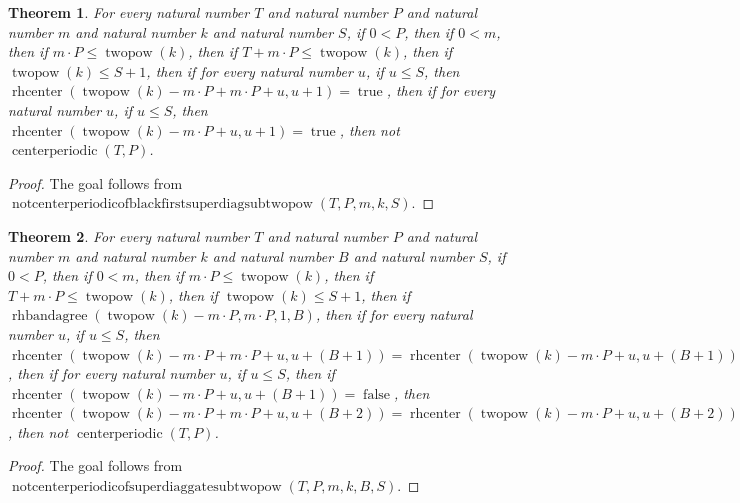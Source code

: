 \documentclass[11pt]{article}
\newtheorem{theorem}{Theorem}[section]
\theoremstyle{definition}
\begin{document}
\begin{theorem}
\label{ll:paper:not-centerperiodic-of-black-first-superdiag-sub-twopow}
For every natural number \(T\) and natural number \(P\) and natural number \(m\) and natural number \(k\) and natural number \(S\), if \(0 < P\), then if \(0 < m\), then if \(m \cdot P \le \operatorname{twopow}(k)\), then if \(T + m \cdot P \le \operatorname{twopow}(k)\), then if \(\operatorname{twopow}(k) \le S + 1\), then if for every natural number \(u\), if \(u \le S\), then \(\operatorname{rhcenter}(\operatorname{twopow}(k) - m \cdot P + m \cdot P + u, u + 1) = \operatorname{true}\), then if for every natural number \(u\), if \(u \le S\), then \(\operatorname{rhcenter}(\operatorname{twopow}(k) - m \cdot P + u, u + 1) = \operatorname{true}\), then not \(\operatorname{centerperiodic}(T, P)\).
\end{theorem}
\begin{proof}
The goal follows from \(\operatorname{notcenterperiodicofblackfirstsuperdiagsubtwopow}(T, P, m, k, S)\).
\end{proof}
\begin{theorem}
\label{ll:paper:not-centerperiodic-of-superdiag-gate-sub-twopow}
For every natural number \(T\) and natural number \(P\) and natural number \(m\) and natural number \(k\) and natural number \(B\) and natural number \(S\), if \(0 < P\), then if \(0 < m\), then if \(m \cdot P \le \operatorname{twopow}(k)\), then if \(T + m \cdot P \le \operatorname{twopow}(k)\), then if \(\operatorname{twopow}(k) \le S + 1\), then if \(\operatorname{rhbandagree}(\operatorname{twopow}(k) - m \cdot P, m \cdot P, 1, B)\), then if for every natural number \(u\), if \(u \le S\), then \(\operatorname{rhcenter}(\operatorname{twopow}(k) - m \cdot P + m \cdot P + u, u + (B + 1)) = \operatorname{rhcenter}(\operatorname{twopow}(k) - m \cdot P + u, u + (B + 1))\), then if for every natural number \(u\), if \(u \le S\), then if \(\operatorname{rhcenter}(\operatorname{twopow}(k) - m \cdot P + u, u + (B + 1)) = \operatorname{false}\), then \(\operatorname{rhcenter}(\operatorname{twopow}(k) - m \cdot P + m \cdot P + u, u + (B + 2)) = \operatorname{rhcenter}(\operatorname{twopow}(k) - m \cdot P + u, u + (B + 2))\), then not \(\operatorname{centerperiodic}(T, P)\).
\end{theorem}
\begin{proof}
The goal follows from \(\operatorname{notcenterperiodicofsuperdiaggatesubtwopow}(T, P, m, k, B, S)\).
\end{proof}
\end{document}
